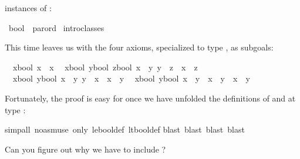 \begin{isabellebody}
\begin{isamarkuptext}
instances of :%
\end{isamarkuptext}%
\isamarkuptrue%
\isamarkupfalse%
\ bool\ {\isacharcolon}{\isacharcolon}\ parord\isanewline
%
\isadelimproof
%
\endisadelimproof
%
\isatagproof
{}\isamarkupfalse%
\ intro{\isacharunderscore}classes%
\begin{isamarkuptxt}%
\noindent
This time  leaves us with the four axioms,
specialized to type , as subgoals:
\begin{isabelle}%
\ {}{\isachardot}\ {\isasymAnd}x{\isasymColon}bool{\isachardot}\ x\ {\isacharless}{\isacharless}{\isacharequal}\ x\isanewline
\ {}{\isachardot}\ {\isasymAnd}{\isacharparenleft}x{\isasymColon}bool{\isacharparenright}\ {\isacharparenleft}y{\isasymColon}bool{\isacharparenright}\ z{\isasymColon}bool{\isachardot}\ {\isasymlbrakk}x\ {\isacharless}{\isacharless}{\isacharequal}\ y{\isacharsemicolon}\ y\ {\isacharless}{\isacharless}{\isacharequal}\ z{\isasymrbrakk}\ {\isasymLongrightarrow}\ x\ {\isacharless}{\isacharless}{\isacharequal}\ z\isanewline
\ {}{\isachardot}\ {\isasymAnd}{\isacharparenleft}x{\isasymColon}bool{\isacharparenright}\ y{\isasymColon}bool{\isachardot}\ {\isasymlbrakk}x\ {\isacharless}{\isacharless}{\isacharequal}\ y{\isacharsemicolon}\ y\ {\isacharless}{\isacharless}{\isacharequal}\ x{\isasymrbrakk}\ {\isasymLongrightarrow}\ x\ {\isacharequal}\ y\isanewline
\ {}{\isachardot}\ {\isasymAnd}{\isacharparenleft}x{\isasymColon}bool{\isacharparenright}\ y{\isasymColon}bool{\isachardot}\ {\isacharparenleft}x\ {\isacharless}{\isacharless}\ y{\isacharparenright}\ {\isacharequal}\ {\isacharparenleft}x\ {\isacharless}{\isacharless}{\isacharequal}\ y\ {\isasymand}\ x\ {\isasymnoteq}\ y{\isacharparenright}%
\end{isabelle}
Fortunately, the proof is easy for 
once we have unfolded the definitions
of \isa{{\isacharless}{\isacharless}} and \isa{{\isacharless}{\isacharless}{\isacharequal}} at type :%
\end{isamarkuptxt}%
\isamarkuptrue%
\isamarkupfalse%
{\isacharparenleft}simp{\isacharunderscore}all\ {\isacharparenleft}no{\isacharunderscore}asm{\isacharunderscore}use{\isacharparenright}\ only{\isacharcolon}\ le{\isacharunderscore}bool{\isacharunderscore}def\ lt{\isacharunderscore}bool{\isacharunderscore}def{\isacharparenright}\isanewline
{}\isamarkupfalse%
{\isacharparenleft}blast{\isacharcomma}\ blast{\isacharcomma}\ blast{\isacharcomma}\ blast{\isacharparenright}%
\endisatagproof
{\isafoldproof}%
%
\isadelimproof
%
\endisadelimproof
%
\begin{isamarkuptext}%
\noindent
Can you figure out why we have to include ?


\end{isamarkuptext}
\end{isabellebody}
